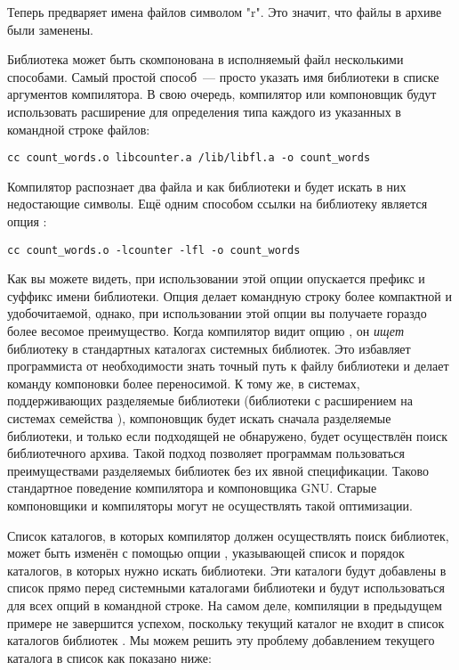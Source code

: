 Теперь  предваряет имена файлов символом "r". Это значит,
что файлы в архиве были заменены.

Библиотека может быть скомпонована в исполняемый файл несколькими
способами. Самый простой способ~--- просто указать имя библиотеки в
списке аргументов компилятора.  В свою очередь, компилятор или
компоновщик будут использовать расширение для определения типа каждого
из указанных в командной строке файлов:

{\footnotesize
\begin{verbatim}
cc count_words.o libcounter.a /lib/libfl.a -o count_words
\end{verbatim}
}

Компилятор  распознает два файла  и
 как библиотеки и будет искать в них
недостающие символы.  Ещё одним способом ссылки на библиотеку является
опция :

{\footnotesize
\begin{verbatim}
cc count_words.o -lcounter -lfl -o count_words
\end{verbatim}
}

Как вы можете видеть, при использовании этой опции опускается префикс
и суффикс имени библиотеки. Опция  делает командную строку
более компактной и удобочитаемой, однако, при использовании этой опции
вы получаете гораздо более весомое преимущество. Когда компилятор
 видит опцию , он \emph{ищет} библиотеку в
стандартных каталогах системных библиотек. Это избавляет программиста
от необходимости знать точный путь к файлу библиотеки и делает команду
компоновки более переносимой. К тому же, в системах, поддерживающих
разделяемые библиотеки (библиотеки с расширением  на
системах семейства \UNIX{}), компоновщик будет искать сначала
разделяемые библиотеки, и только если подходящей не обнаружено, будет
осуществлён поиск библиотечного архива. Такой подход позволяет
программам пользоваться преимуществами разделяемых библиотек без их
явной спецификации. Таково стандартное поведение компилятора и
компоновщика GNU. Старые компоновщики и компиляторы могут не
осуществлять такой оптимизации.

Список каталогов, в которых компилятор должен осуществлять поиск
библиотек, может быть изменён с помощью опции ,
указывающей список и порядок каталогов, в которых нужно искать
библиотеки. Эти каталоги будут добавлены в список прямо перед
системными каталогами библиотеки и будут использоваться для всех опций
 в командной строке. На самом деле, компиляции в
предыдущем примере не завершится успехом, поскольку текущий каталог не
входит в список каталогов библиотек . Мы можем решить эту
проблему добавлением текущего каталога в список как показано ниже:

